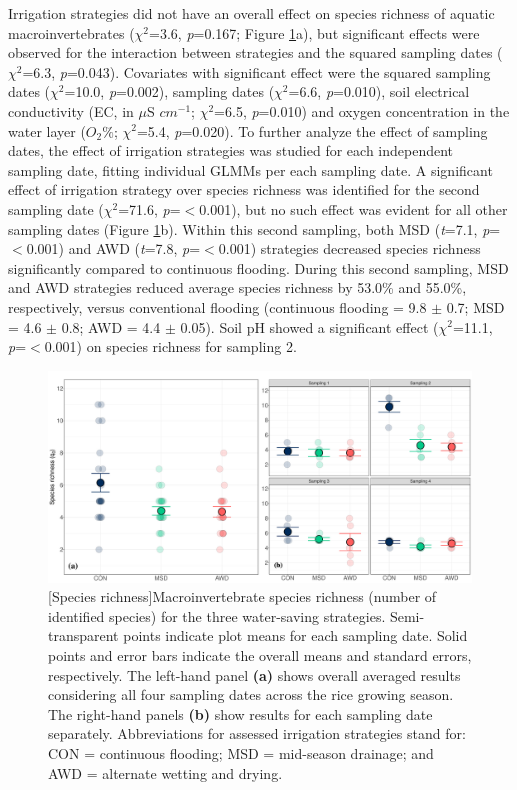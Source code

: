  Irrigation strategies did not have an overall effect on species richness of aquatic macroinvertebrates ($\chi^2$=3.6, \textit{p}=0.167; Figure \ref{Div_q0}a), but significant effects were observed for the interaction between strategies and the squared sampling dates ($\chi^2$=6.3, \textit{p}=0.043). Covariates with significant effect were the squared sampling dates ($\chi^2$=10.0, \textit{p}=0.002), sampling dates ($\chi^2$=6.6, \textit{p}=0.010), soil electrical conductivity (EC, in $\mu$S $cm^{-1}$; $\chi^2$=6.5, \textit{p}=0.010) and oxygen concentration in the water layer ($O_{2}\%$; $\chi^2$=5.4, \textit{p}=0.020). To further analyze the effect of sampling dates, the effect of irrigation strategies was studied for each independent sampling date, fitting individual GLMMs per each sampling date. A significant effect of irrigation strategy over species richness was identified for the second sampling date ($\chi^2$=71.6, \textit{p}=$<$0.001), but no such effect was evident for all other sampling dates (Figure \ref{Div_q0}b). Within this second sampling, both MSD (\textit{t}=7.1, \textit{p}=$<$0.001) and AWD (\textit{t}=7.8, \textit{p}=$<$0.001) strategies decreased species richness significantly compared to continuous flooding. During this second sampling, MSD and AWD strategies reduced average species richness by 53.0\% and 55.0\%, respectively, versus conventional flooding (continuous flooding = 9.8 $\pm$ 0.7; MSD = 4.6 $\pm$ 0.8; AWD = 4.4 $\pm$ 0.05). Soil pH showed a significant effect ($\chi^2$=11.1, \textit{p}=$<$0.001) on species richness for sampling 2.\\
 
 \begin{figure} [ht]
\captionsetup{justification=justified}
	\centering 
	\includegraphics[scale=0.33, center]{Figures/Chapter_1/Arr.q0_ind.samp.pdf}
	[Species richness]{Macroinvertebrate species richness (number of identified species) for the three water-saving strategies. Semi-transparent points indicate plot means for each sampling date. Solid points and error bars indicate the overall means and standard errors, respectively. The left-hand panel \textbf{(a)} shows overall averaged results considering all four sampling dates across the rice growing season. The right-hand panels \textbf{(b)} show results for each sampling date separately. Abbreviations for assessed irrigation strategies stand for: CON = continuous flooding; MSD = mid-season drainage; and AWD = alternate wetting and drying.}   
	\label{Div_q0}
\end{figure}

